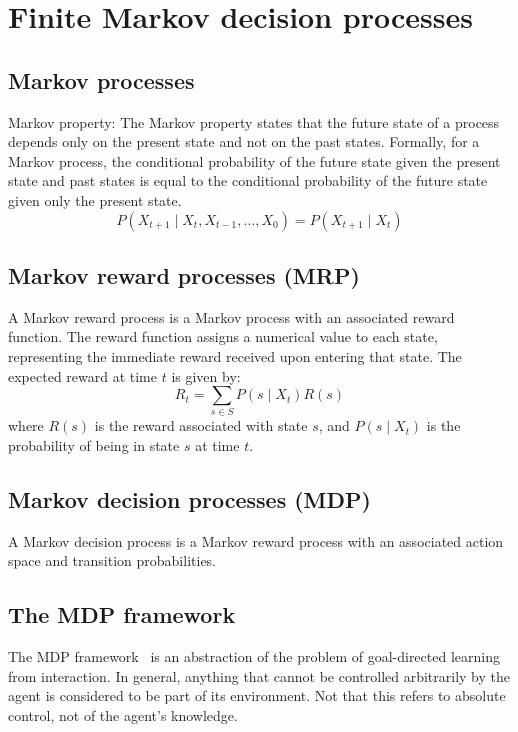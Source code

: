 \section{Finite Markov decision processes}

\subsection{Markov processes}

Markov property:
The Markov property states that the future state of a process depends only on the present state and not on the past states.
Formally, for a Markov process, the conditional probability of the future state given the present state and past states is equal to the conditional probability of the future state given only the present state.
\begin{equation}
    P(X_{t+1} \mid X_t, X_{t-1}, \ldots, X_0) = P(X_{t+1} \mid X_t)
\end{equation}

\subsection{Markov reward processes (MRP)}

A Markov reward process is a Markov process with an associated reward function.
The reward function assigns a numerical value to each state, representing the immediate reward received upon entering that state.
The expected reward at time \( t \) is given by:
\begin{equation}
    R_t = \sum_{s \in S} P(s \mid X_t) R(s)
\end{equation}
where \( R(s) \) is the reward associated with state \( s \), and \( P(s \mid X_t) \) is the probability of being in state \( s \) at time \( t \).

\subsection{Markov decision processes (MDP)}

A Markov decision process is a Markov reward process with an associated action space and transition probabilities.

\subsection{The MDP framework}

The MDP framework~\cite{Sutton1998} is an abstraction of the problem of goal-directed learning from interaction.
In general, anything that cannot be controlled arbitrarily by the agent is considered to be part of its environment. Not that this refers to absolute control, not of the agent's knowledge.

